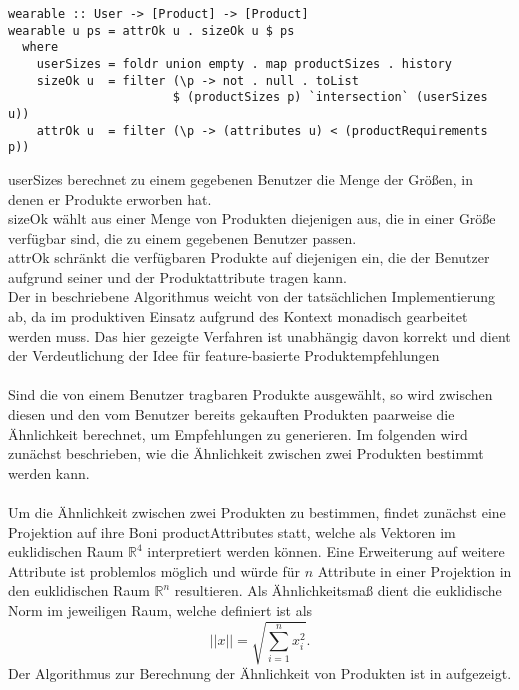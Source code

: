 \begin{lstlisting}[label=code:wearable,caption={Algorithmus zur Bestimmung von Produkten, die ein Benutzer tragen kann}]
wearable :: User -> [Product] -> [Product]
wearable u ps = attrOk u . sizeOk u $ ps
  where
    userSizes = foldr union empty . map productSizes . history
    sizeOk u  = filter (\p -> not . null . toList 
                       $ (productSizes p) `intersection` (userSizes u))
    attrOk u  = filter (\p -> (attributes u) < (productRequirements p))
\end{lstlisting}
\textsf{userSizes} berechnet zu einem gegebenen Benutzer die Menge der Größen, in denen er Produkte erworben hat. \\
\textsf{sizeOk} wählt aus einer Menge von Produkten diejenigen aus, die in einer Größe verfügbar sind, die zu einem gegebenen Benutzer passen.\\
\textsf{attrOk} schränkt die verfügbaren Produkte auf diejenigen ein, die der Benutzer aufgrund seiner und der Produktattribute tragen kann.
\\
Der in  beschriebene Algorithmus weicht von der tatsächlichen Implementierung ab, da im produktiven Einsatz aufgrund des Kontext monadisch gearbeitet werden muss. Das hier gezeigte Verfahren ist unabhängig davon korrekt und dient der Verdeutlichung der Idee für feature-basierte Produktempfehlungen\\
\\
Sind die von einem Benutzer tragbaren Produkte ausgewählt, so wird zwischen diesen und den vom Benutzer bereits gekauften Produkten paarweise die Ähnlichkeit berechnet, um Empfehlungen zu generieren. Im folgenden wird zunächst be\-schrie\-ben, wie die Ähnlichkeit zwischen zwei Produkten bestimmt werden kann.\\
\\
Um die Ähnlichkeit zwischen zwei Produkten zu bestimmen, findet zunächst eine Projektion auf ihre Boni \textsf{productAttributes} statt, welche als Vektoren im euklidischen Raum $\mathbb{R}^4$ interpretiert werden können. Eine Erweiterung auf weitere Attribute ist problemlos möglich und würde für $n$ Attribute in einer Projektion in den euklidischen Raum $\mathbb{R}^n$ resultieren. Als Ähnlichkeitsmaß dient die euklidische Norm im jeweiligen Raum, welche definiert ist als
\begin{equation}
  \left|\left| x \right|\right| = \sqrt{\sum_{i=1}^n x_i^2}.
\end{equation}
Der Algorithmus zur Berechnung der Ähnlichkeit von Produkten ist in  aufgezeigt.

